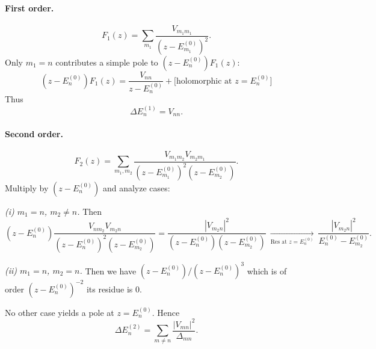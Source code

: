\paragraph{First order.}
\[
  F_1(z)=\sum_{m_1}\frac{V_{m_1m_1}}{(z-E_{m_1}^{(0)})^2}.
\]
Only $m_1=n$ contributes a simple pole to $(z-E_n^{(0)})F_1(z)$:
\[
  (z-E_n^{(0)})F_1(z)=\frac{V_{nn}}{z-E_n^{(0)}}+\bigl[\text{holomorphic at
  }z=E_n^{(0)}\bigr]
\]
Thus
\begin{equation}
  \label{eq:DE1}
  \Delta E_n^{(1)}=V_{nn}.
\end{equation}

\paragraph{Second order.}
\[
  F_2(z)=\sum_{m_1,m_2}\frac{V_{m_1m_2}V_{m_2m_1}}{(z-E_{m_1}^{(0)})^2(z-E_{m_2}^{(0)})}.
\]
Multiply by $(z-E_n^{(0)})$ and analyze cases:

\emph{(i) $m_1=n$, $m_2\neq n$.} Then
\[
  (z-E_n^{(0)})\frac{V_{n m_2}V_{m_2 n}}{(z-E_n^{(0)})^2(z-E_{m_2}^{(0)})}
  =\frac{|V_{m_2n}|^2}{(z-E_n^{(0)})(z-E_{m_2}^{(0)})}
  \ \xrightarrow[\text{Res at
  }z=E_n^{(0)}]{}\ \frac{|V_{m_2n}|^2}{E_n^{(0)}-E_{m_2}^{(0)}}.
\]

\emph{(ii) $m_1=n$, $m_2=n$.} Then we have
$(z-E_n^{(0)})/(z-E_n^{(0)})^3$ which is of order
$(z-E_n^{(0)})^{-2}$ its residue is 0.

No other case yields a pole at $z=E_n^{(0)}$. Hence
\begin{equation}
  \label{eq:DE2}
  \Delta E_n^{(2)}=\sum_{m\neq n}\frac{|V_{mn}|^2}{\Delta_{mn}}.
\end{equation}

